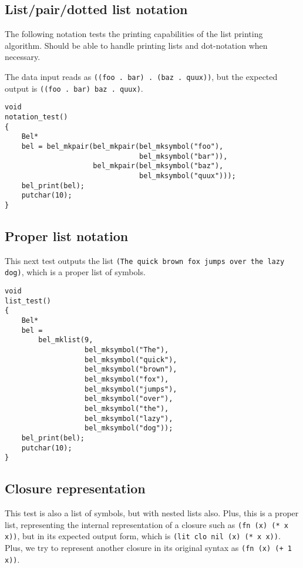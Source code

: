 \documentclass[openright,a4paper,twoside,12pt]{memoir}
\begin{document}
\subsection{List/pair/dotted list notation}
\label{sec:orgd55a564}

The following notation tests the printing capabilities of the list
printing algorithm. Should be able to handle printing lists and
dot-notation when necessary.

The data input reads as \texttt{((foo . bar) . (baz . quux))}, but the expected
output is \texttt{((foo . bar) baz . quux)}.

\begin{verbatim}
void
notation_test()
{
    Bel*
    bel = bel_mkpair(bel_mkpair(bel_mksymbol("foo"),
                                bel_mksymbol("bar")),
                     bel_mkpair(bel_mksymbol("baz"),
                                bel_mksymbol("quux")));
    bel_print(bel);
    putchar(10);
}
\end{verbatim}

\subsection{Proper list notation}
\label{sec:org59b876c}

This next test outputs the list \texttt{(The quick brown fox jumps over the
lazy dog)}, which is a proper list of symbols.

\begin{verbatim}
void
list_test()
{
    Bel*
    bel =
        bel_mklist(9,
                   bel_mksymbol("The"),
                   bel_mksymbol("quick"),
                   bel_mksymbol("brown"),
                   bel_mksymbol("fox"),
                   bel_mksymbol("jumps"),
                   bel_mksymbol("over"),
                   bel_mksymbol("the"),
                   bel_mksymbol("lazy"),
                   bel_mksymbol("dog"));
    bel_print(bel);
    putchar(10);
}
\end{verbatim}

\subsection{Closure representation}
\label{sec:org1230d50}

This test is also a list of symbols, but with nested lists also. Plus,
this is a proper list, representing the internal representation of a
closure such as \texttt{(fn (x) (* x x))}, but in its expected output form,
which is \texttt{(lit clo nil (x) (* x x))}. Plus, we try to represent another
closure in its original syntax as \texttt{(fn (x) (+ 1 x))}.
\end{document}

